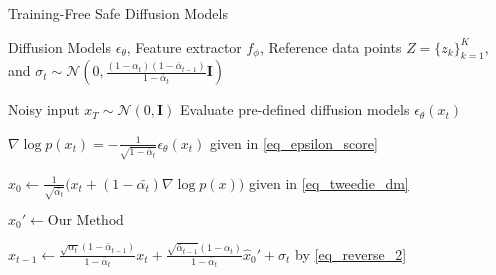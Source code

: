 \begin{algorithm}[!tb]
  \caption{Training-Free Safe Diffusion Models}
  \label{alg:safer_epsilon}
  \begin{algorithmic}
    Diffusion Models $\epsilon_{\theta}$, Feature extractor $f_{\phi}$, Reference data points $Z = \{z_k\}_{k=1}^K$, and $\sigma_t \sim \mathcal{N}(0, \frac{(1 - \alpha_t)(1 - \bar{\alpha}_{t-1})}{1 - \bar{\alpha}_t}\textbf{I}) $
    \vspace{.1cm} 
    
     Noisy input $x_T \sim \mathcal{N}(0, \textbf{I})$
    \STATE Evaluate pre-defined diffusion models $\epsilon_{\theta}(x_t)$

    \STATE $\nabla \log p(x_t) = - \frac{1}{\sqrt{1 - \bar{\alpha}_t}} \epsilon_{\theta}(x_t)$ \hfill given in \eqref{eq_epsilon_score}
    
    \STATE   
    $\hat{x}_0 \leftarrow 
    \frac{1}{\sqrt{\bar{\alpha_t}}} \big(x_t + (1- \bar{\alpha_t})\nabla \log p(x)\big)$  \hfill given in \eqref{eq_tweedie_dm}

    \STATE
    ${\hat{x}_0}' \leftarrow \text{Our Method}$

    \STATE
    $x_{t-1} \leftarrow \frac{\sqrt{\alpha_t} (1 - \bar{\alpha}_{t-1})}{1 - \bar{\alpha}_t} x_t + \frac{\sqrt{\bar{\alpha}_{t-1}}(1-\alpha_t)}{1 - \bar{\alpha}_t}{\hat{x}_0}' + \sigma_t $ by \eqref{eq_reverse_2}
    \ENDFOR 
  \end{algorithmic}
\end{algorithm}